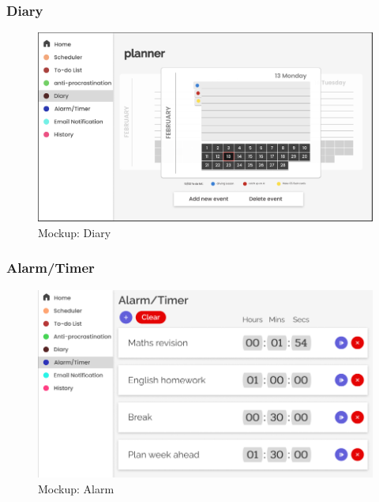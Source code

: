 \documentclass[a4paper]{article}
\begin{document}
\subsubsection{Diary}

\begin{figure}[H] %
	\centering %
	\includegraphics[width=1\textwidth]{./images/Mockup_Diary.jpg} %
	\caption*{Mockup: Diary} %
	\label{Fig.Diary} %
\end{figure}

\subsubsection{Alarm/Timer}

\begin{figure}[H] %
	\centering %
	\includegraphics[width=1\textwidth]{./images/Mockup_AlarmTimer.png} %
	\caption*{Mockup: Alarm} %
	\label{Fig.Alarm} %
\end{figure}
\end{document}
